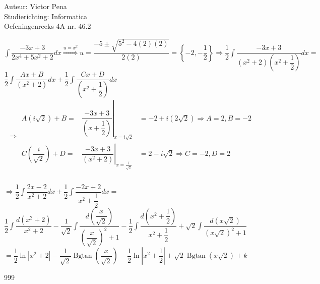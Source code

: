 \documentclass[a4paper]{article}
\begin{document}
	
	\noindent \large Auteur: Victor Pena \\
	\noindent \large Studierichting: Informatica\\
	\noindent \large Oefeningenreeks 4A nr. 46.2\\
	
	\medskip
	
	\normalsize 
	
	$\displaystyle\int\dfrac{-3x+3}{2x^4+5x^2+2}dx \overset{u=x^2}{\Rightarrow} u = \dfrac{-5 \pm \sqrt{5^2-4(2)(2)}}{2(2)} = \left\{-2,-\dfrac{1}{2}\right\} \Rightarrow \dfrac{1}{2}\displaystyle\int \dfrac{-3x+3}{\left(x^2+2\right)\left(x^2+\dfrac{1}{2}\right) }dx = $\\
	
	$\dfrac{1}{2} \displaystyle\int\dfrac{Ax+B}{(x^2+2)}dx + \dfrac{1}{2}\displaystyle\int \dfrac{Cx+D}{\left(x^2+\dfrac{1}{2}\right)}dx $ \\
	
	$$\Rightarrow \begin{array}{ccc}
		A\left(i\sqrt{2}\right) + B=&\left.\dfrac{-3x+3}{\left(x+\dfrac{1}{2}\right)}\right|_{x=i\sqrt{2}}&=-2+i(2\sqrt{2}) \Rightarrow A = 2, B = -2 \\
		C\left(\dfrac{i}{\sqrt{2}}\right) + D=&\left.\dfrac{-3x+3}{(x^2+2)}\right|_{x=\tfrac{i}{\sqrt{2}}}&=2-i\sqrt{2} \Rightarrow C =-2, D = 2 \\
	\end{array}$$ \\
	
	$\Rightarrow \dfrac{1}{2} \displaystyle\int \dfrac{2x-2}{x^2+2}dx + \dfrac{1}{2} \displaystyle\int \dfrac{-2x+2}{x^2+\dfrac{1}{2}}dx = $\\
	
	$ \dfrac{1}{2} \displaystyle\int \dfrac{d(x^2+2)}{x^2+2} - \dfrac{1}{\sqrt{2}} \displaystyle\int\dfrac{d\left(\dfrac{x}{\sqrt{2}}\right)}{\left(\dfrac{x}{\sqrt{2}}\right)^2 + 1} - \dfrac{1}{2} \displaystyle\int \dfrac{d\left(x^2+\dfrac{1}{2}\right)}{x^2+\dfrac{1}{2}} + \sqrt{2} \displaystyle\int \dfrac{d\left(x\sqrt{2}\right)}{(x\sqrt{2})^2+1}$ \\
	
	$= \dfrac{1}{2} \ln|x^2+2| - \dfrac{1}{\sqrt{2}} \operatorname{Bgtan}\left(\dfrac{x}{\sqrt{2}}\right) - \dfrac{1}{2} \ln\left|x^2+\dfrac{1}{2}\right| + \sqrt{2}\operatorname{Bgtan}\left(x\sqrt{2}\right) + k$
	
	
	\begin{thebibliography}{999}
	\end{thebibliography}
\end{document}
